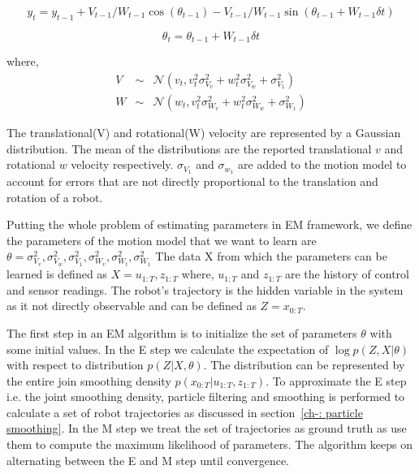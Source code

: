 \documentclass[12pt]{dalcsthesis}
\begin{document}
\begin{equation}
\label{eq:velocity motion model_y}
y_{t}=y_{t-1}+V_{t-1}/W_{t-1} \cos(\theta_{t-1})- V_{t-1}/W_{t-1} \sin(\theta_{t-1} + W_{t-1} \delta t)
\end{equation}

\begin{equation}
\label{eq:velocity motion model_theta}
\theta_{t}=\theta_{t-1}+ W_{t-1} \delta t
\end{equation}

where,
\begin{eqnarray}
V &\sim& \mathcal{N}(v_{t},v_{t}^{2}\sigma_{V_{v}}^{2}+w_{t}^{2}\sigma_{V_{w}}^{2}+\sigma_{V_{1}}^{2})\\
W &\sim& \mathcal{N}(w_{t},v_{t}^{2}\sigma_{W_{v}}^{2}+w_{t}^{2}\sigma_{W_{w}}^{2}+\sigma_{W_{1}}^{2})
\end{eqnarray}

The translational(V) and rotational(W) velocity are represented by a Gaussian distribution. The mean of the distributions are the reported translational $v$ and rotational $w$ velocity respectively. $\sigma_{V_{1}} $ and $\sigma_{w_{1}}$ are added to the motion model to account for errors that are not directly proportional to the translation and rotation of a robot.

Putting the whole problem of estimating parameters in EM framework, we define the parameters of the motion model that we want to learn are $\theta={\sigma_{V_{v}}^{2},\sigma_{V_{w}}^{2},\sigma_{V_{1}}^{2},\sigma_{W_{v}}^{2},\sigma_{W_{t}}^{2},\sigma_{W_{1}}^{2}}$
The data X from which the parameters can be learned is defined as $X={u_{1:T},z_{1:T}}$
where, $u_{1:T}$ and $z_{1:T}$ are the history of control and sensor readings. The robot's trajectory is the hidden variable in the system as it not directly observable and can be defined as $Z=x_{0:T}$.

The first step in an EM algorithm is to initialize the set of parameters $\theta$ with some initial values. In the E step we calculate the expectation of $\log p(Z,X|\theta)$ with respect to distribution $p(Z|X,\theta)$. The distribution can be represented by the entire join smoothing density $p(x_{0:T}|u_{1:T},z_{1:T})$. To approximate the E step i.e. the joint smoothing density, particle filtering and smoothing is performed to calculate a set of robot trajectories as discussed in section~\ref{ch-: particle smoothing}. In the M step we treat the set of trajectories as ground truth as use them to compute the maximum likelihood of parameters. The algorithm keeps on alternating between the E and M step until convergence. 
\end{document}
